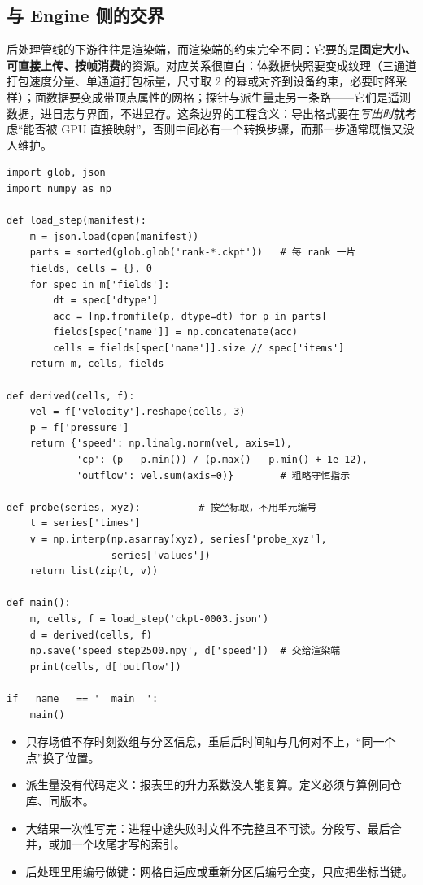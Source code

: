 \documentclass[12pt,a4paper,fontset=fandol]{ctexbook}
\newcommand{\Lang}[1]{\textsf{#1}}
\newcommand{\DomEngine}{\Lang{Engine}}
\begin{document}
\subsection*{与 \DomEngine{} 侧的交界}

后处理管线的下游往往是渲染端，而渲染端的约束完全不同：它要的是\textbf{固定大小、可直接上传、按帧消费}的资源。对应关系很直白：体数据快照要变成纹理（三通道打包速度分量、单通道打包标量，尺寸取 2 的幂或对齐到设备约束，必要时降采样）；面数据要变成带顶点属性的网格；探针与派生量走另一条路——它们是遥测数据，进日志与界面，不进显存。这条边界的工程含义：导出格式要在\emph{写出时}就考虑``能否被 GPU 直接映射''，否则中间必有一个转换步骤，而那一步通常既慢又没人维护。

\begin{lstlisting}[style=pythonstyle,
  caption={后处理脚本的数据流形状：读清单、取字段、算派生量、出图},
  label={lst:ch08-post-py}]
import glob, json
import numpy as np

def load_step(manifest):
    m = json.load(open(manifest))
    parts = sorted(glob.glob('rank-*.ckpt'))   # 每 rank 一片
    fields, cells = {}, 0
    for spec in m['fields']:
        dt = spec['dtype']
        acc = [np.fromfile(p, dtype=dt) for p in parts]
        fields[spec['name']] = np.concatenate(acc)
        cells = fields[spec['name']].size // spec['items']
    return m, cells, fields

def derived(cells, f):
    vel = f['velocity'].reshape(cells, 3)
    p = f['pressure']
    return {'speed': np.linalg.norm(vel, axis=1),
            'cp': (p - p.min()) / (p.max() - p.min() + 1e-12),
            'outflow': vel.sum(axis=0)}        # 粗略守恒指示

def probe(series, xyz):          # 按坐标取，不用单元编号
    t = series['times']
    v = np.interp(np.asarray(xyz), series['probe_xyz'],
                  series['values'])
    return list(zip(t, v))

def main():
    m, cells, f = load_step('ckpt-0003.json')
    d = derived(cells, f)
    np.save('speed_step2500.npy', d['speed'])  # 交给渲染端
    print(cells, d['outflow'])

if __name__ == '__main__':
    main()
\end{lstlisting}

\begin{warning}[title={导出与后处理的四个陷阱}]
\begin{itemize}
\item 只存场值不存时刻数组与分区信息，重启后时间轴与几何对不上，``同一个点''换了位置。
\item 派生量没有代码定义：报表里的升力系数没人能复算。定义必须与算例同仓库、同版本。
\item 大结果一次性写完：进程中途失败时文件不完整且不可读。分段写、最后合并，或加一个收尾才写的索引。
\item 后处理里用编号做键：网格自适应或重新分区后编号全变，只应把坐标当键。
\end{itemize}
\end{warning}
\end{document}
